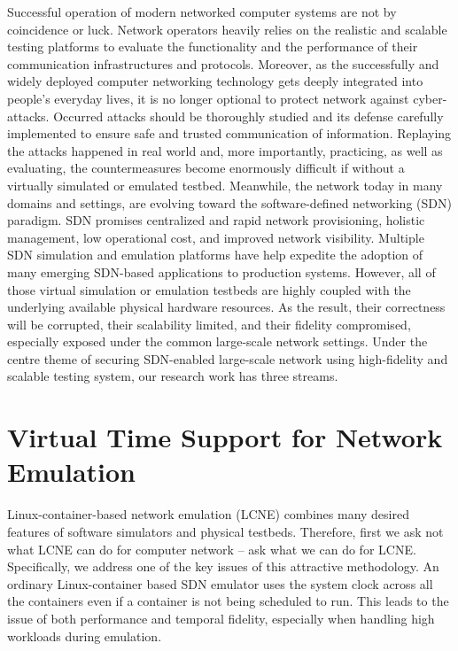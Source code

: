 Successful operation of modern networked computer systems are not by coincidence or luck.
Network operators heavily relies on the realistic and scalable testing platforms to
evaluate the functionality and the performance of their communication infrastructures and protocols.
Moreover, as the successfully and widely deployed computer networking technology gets deeply integrated into people's everyday lives,
it is no longer optional to protect network against cyber-attacks.
Occurred attacks should be thoroughly studied and its defense carefully implemented to ensure safe and trusted communication of information.
Replaying the attacks happened in real world and, more importantly, practicing, as well as evaluating, the countermeasures become 
enormously difficult if without a virtually simulated or emulated testbed.
Meanwhile, the network today in many domains and settings, are evolving toward the software-defined networking (SDN) paradigm.
SDN promises centralized and rapid network provisioning, holistic management, low operational cost, and improved network visibility.
Multiple SDN simulation and emulation platforms have help expedite the adoption of many emerging SDN-based applications to production systems.
However, all of those virtual simulation or emulation testbeds are highly coupled with the underlying available physical hardware resources.
As the result, their correctness will be corrupted, their scalability limited, and their fidelity compromised,
especially exposed under the common large-scale network settings.
Under the centre theme of securing SDN-enabled large-scale network using high-fidelity and scalable testing system, our research work has three streams.

\section{Virtual Time Support for Network Emulation}
Linux-container-based network emulation (LCNE) combines many desired features of software simulators and physical testbeds.
Therefore, first we ask not what LCNE can do for computer network -- ask what we can do for LCNE.
Specifically, we address one of the key issues of this attractive methodology.
An ordinary Linux-container based SDN emulator uses the system clock across all the containers even if a container is not being scheduled to run.
This leads to the issue of both performance and temporal fidelity, especially when handling high workloads during emulation.

